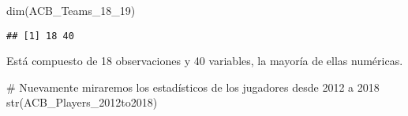 \documentclass[]{article}
\newenvironment{Shaded}{\begin{snugshade}}{\end{snugshade}}
\newcommand{\KeywordTok}[1]{\textcolor[rgb]{0.94,0.87,0.69}{#1}}
\newcommand{\DecValTok}[1]{\textcolor[rgb]{0.86,0.86,0.80}{#1}}
\newcommand{\CommentTok}[1]{\textcolor[rgb]{0.50,0.62,0.50}{#1}}
\newcommand{\NormalTok}[1]{\textcolor[rgb]{0.80,0.80,0.80}{#1}}
\begin{document}
\begin{Shaded}
\begin{Highlighting}[]
\KeywordTok{dim}\NormalTok{(ACB_Teams_18_}\DecValTok{19}\NormalTok{)}
\end{Highlighting}
\end{Shaded}

\begin{verbatim}
## [1] 18 40
\end{verbatim}

Está compuesto de 18 observaciones y 40 variables, la mayoría de ellas
numéricas.

\begin{Shaded}
\begin{Highlighting}[]
\CommentTok{# Nuevamente miraremos los estadísticos de los jugadores desde 2012 a 2018}
\KeywordTok{str}\NormalTok{(ACB_Players_2012to2018)}
\end{Highlighting}
\end{Shaded}
\end{document}
